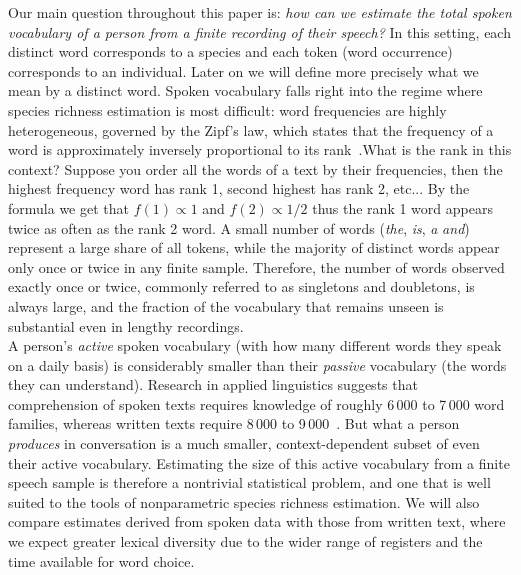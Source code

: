 \documentclass{article}
\begin{document}
Our main question throughout this paper is: \emph{how can we estimate the total spoken vocabulary of a person from a finite recording of their speech?} In this setting, each distinct word corresponds to a species and each token (word occurrence) corresponds to an individual. Later on we will define more precisely what we mean by a distinct word. Spoken vocabulary falls right into the regime where species richness estimation is most difficult: word frequencies are highly heterogeneous, governed by the Zipf's law, which states that the frequency of a word is approximately inversely proportional to its rank~\cite{zipf1949,baayen2001}.What is the rank in this context? Suppose you order all the words of a text by their frequencies, then the highest frequency word has rank 1, second highest has rank 2, etc... By the formula we get that $f(1)\propto{1}$ and $f(2)\propto{1/2}$ thus the rank 1 word appears twice as often as the rank 2 word.  A small number of words (\emph{the}, \emph{is}, \emph{a} \emph{and}) represent a large share of all tokens, while the majority of distinct words appear only once or twice in any finite sample. Therefore, the number of words observed exactly once or twice, commonly referred to as singletons and doubletons, is always large, and the fraction of the vocabulary that remains unseen is substantial even in lengthy recordings.\\

A person's \emph{active} spoken vocabulary (with how many different words they speak on a daily basis) is considerably smaller than their \emph{passive} vocabulary (the words they can understand). Research in applied linguistics suggests that comprehension of spoken texts requires knowledge of roughly 6\,000 to 7\,000 word families, whereas written texts require 8\,000 to 9\,000~\cite{nation2006}. But what a person \emph{produces} in conversation is a much smaller, context-dependent subset of even their active vocabulary. Estimating the size of this active vocabulary from a finite speech sample is therefore a nontrivial statistical problem, and one that is well suited to the tools of nonparametric species richness estimation. We will also compare estimates derived from spoken data with those from written text, where we expect greater lexical diversity due to the wider range of registers and the time available for word choice.\\
\end{document}
